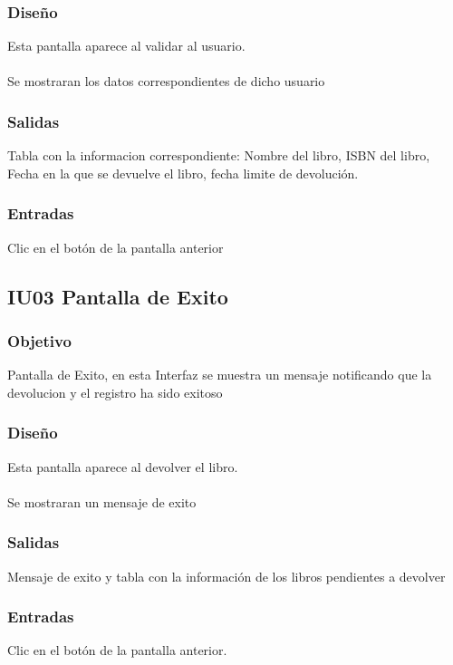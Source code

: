 \subsubsection{Diseño}
	Esta pantalla aparece al validar al usuario.  \\\\
	Se mostraran los datos correspondientes de dicho usuario



\subsubsection{Salidas}
	\begin{Citemize}
		\item Tabla con la informacion correspondiente: Nombre del libro, ISBN del libro, Fecha en la que se devuelve el libro, fecha limite de devolución. 
	\end{Citemize}
	
\subsubsection{Entradas}
	\begin{Citemize}
		\item Clic en el botón  de la pantalla anterior
	\end{Citemize}







\subsection{IU03 Pantalla de Exito}

\subsubsection{Objetivo}
	Pantalla de Exito, en esta Interfaz se muestra un mensaje notificando que la devolucion y el registro ha sido exitoso  

\subsubsection{Diseño}
	Esta pantalla aparece al devolver el libro.  \\\\
	Se mostraran un mensaje de exito



\subsubsection{Salidas}
	\begin{Citemize}
		\item Mensaje de exito y tabla con la información de los libros pendientes a devolver
	\end{Citemize}
	
\subsubsection{Entradas}
	\begin{Citemize}
		\item Clic en el botón  de la pantalla anterior. 
	\end{Citemize}




